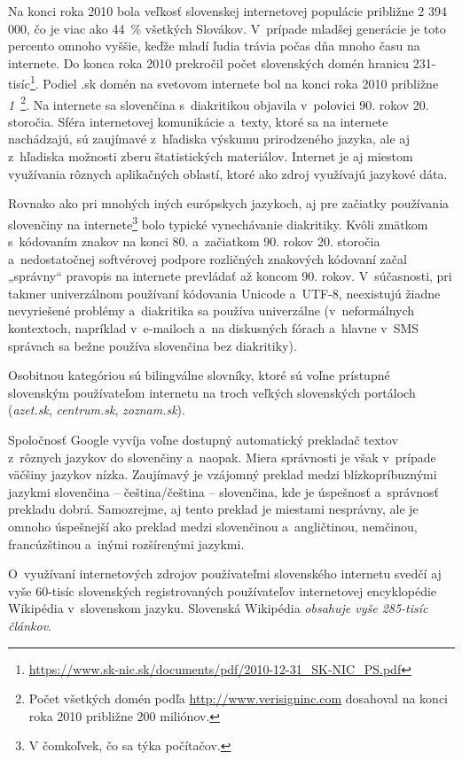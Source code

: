 Na konci roka 2010 bola veľkosť slovenskej internetovej populácie približne 2 394 000, čo je viac ako 44~\% všetkých Slovákov. V~prípade mladšej generácie je toto percento omnoho vyššie, keďže mladí ľudia trávia počas dňa mnoho času na internete. Do konca roka 2010 prekročil počet slovenských domén hranicu 231-tisíc\footnote{\url{https://www.sk-nic.sk/documents/pdf/2010-12-31_SK-NIC_PS.pdf}}. Podiel .sk domén na svetovom internete bol na konci roka 2010 približne \emph{1~\textperthousand}\footnote{Počet všetkých domén podľa \url{http://www.verisigninc.com} dosahoval na konci roka 2010 približne 200 miliónov.}. Na internete sa slovenčina s~diakritikou objavila v~polovici 90. rokov 20. storočia. Sféra internetovej komunikácie a~texty, ktoré sa na internete nachádzajú, sú zaujímavé z~hľadiska výskumu prirodzeného jazyka, ale aj z~hľadiska možnosti zberu štatistických materiálov. Internet je aj miestom využívania rôznych aplikačných oblastí, ktoré ako zdroj využívajú jazykové dáta. 

Rovnako ako pri mnohých iných európskych jazykoch, aj pre začiatky používania slovenčiny na internete\footnote{V čomkoľvek, čo sa týka počítačov.} bolo typické vynechávanie diakritiky. Kvôli zmätkom s~kódovaním znakov na konci 80. a~začiatkom 90. rokov 20. storočia a~nedostatočnej softvérovej podpore rozličných znakových kódovaní začal „správny“ pravopis na internete prevládať až koncom 90. rokov. V~súčasnosti, pri takmer univerzálnom používaní kódovania Unicode a~UTF-8, neexistujú žiadne nevyriešené problémy a~diakritika sa používa univerzálne (v~neformálnych kontextoch, napríklad v~e-mailoch a~na diskusných fórach a~hlavne v~SMS správach sa bežne používa slovenčina bez diakritiky).

Osobitnou kategóriou sú bilingválne slovníky, ktoré sú voľne prístupné slovenským používateľom internetu na troch veľkých slovenských portáloch (\emph{azet.sk}, \emph{centrum.sk}, \emph{zoznam.sk}).

Spoločnosť Google vyvíja voľne dostupný automatický prekladač textov z~rôznych jazykov do slovenčiny a~naopak. Miera správnosti je však v~prípade väčšiny jazykov nízka. Zaujímavý je vzájomný preklad medzi blízkopríbuznými jazykmi slovenčina – čeština/čeština – slovenčina, kde je úspešnosť a~správnosť prekladu dobrá. Samozrejme, aj tento preklad je miestami nesprávny, ale je omnoho úspešnejší ako preklad medzi slovenčinou a~angličtinou, nemčinou, francúzštinou a~inými rozšírenými jazykmi.

O~využívaní internetových zdrojov používateľmi slovenského internetu svedčí aj vyše 60-tisíc slovenských registrovaných používateľov internetovej encyklopédie Wikipédia v~slovenskom jazyku. Slovenská Wikipédia \emph{obsahuje vyše 285-tisíc článkov}.
